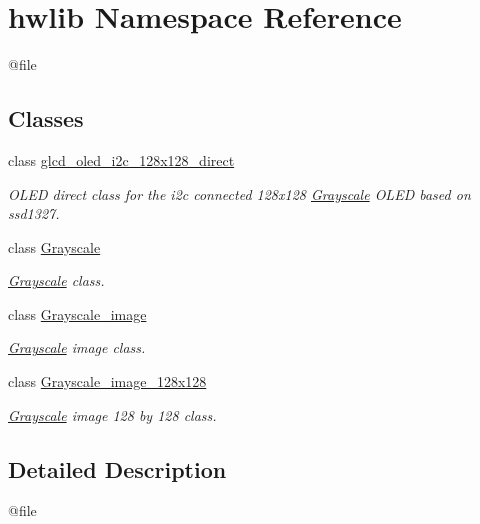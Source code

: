 \hypertarget{namespacehwlib}{}\section{hwlib Namespace Reference}
\label{namespacehwlib}


@file  


\subsection*{Classes}
\begin{DoxyCompactItemize}
\item 
class \hyperlink{classhwlib_1_1glcd__oled__i2c__128x128__direct}{glcd\+\_\+oled\+\_\+i2c\+\_\+128x128\+\_\+direct}
\begin{DoxyCompactList}\small\item\em O\+L\+ED direct class for the i2c connected 128x128 \hyperlink{classhwlib_1_1Grayscale}{Grayscale} O\+L\+ED based on ssd1327. \end{DoxyCompactList}\item 
class \hyperlink{classhwlib_1_1Grayscale}{Grayscale}
\begin{DoxyCompactList}\small\item\em \hyperlink{classhwlib_1_1Grayscale}{Grayscale} class. \end{DoxyCompactList}\item 
class \hyperlink{classhwlib_1_1Grayscale__image}{Grayscale\+\_\+image}
\begin{DoxyCompactList}\small\item\em \hyperlink{classhwlib_1_1Grayscale}{Grayscale} image class. \end{DoxyCompactList}\item 
class \hyperlink{classhwlib_1_1Grayscale__image__128x128}{Grayscale\+\_\+image\+\_\+128x128}
\begin{DoxyCompactList}\small\item\em \hyperlink{classhwlib_1_1Grayscale}{Grayscale} image 128 by 128 class. \end{DoxyCompactList}\end{DoxyCompactItemize}


\subsection{Detailed Description}
@file 